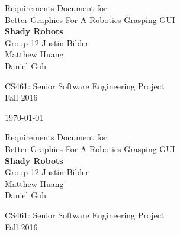 \documentclass[10pt,journal,compsoc,draftclsnofoot]{IEEEtran}
\begin{document}
\onecolumn

\begin{titlepage}
\null
\vspace{35mm}

\begin{flushleft}
\begin{bfseries}
	\vskip2mm
	\Huge{Requirements Document for\\ Better Graphics For A Robotics Grasping GUI}\\
	\vspace{30mm}
	\textbf{\huge Shady Robots} \\
	\vskip2mm
	\large{Group 12}
	\vskip5mm
	\Large{Justin Bibler \\
	Matthew Huang \\
	Daniel Goh \\}
\end{bfseries}

\vspace{15mm}
\Large{CS461: Senior Software Engineering Project} \\
\Large{Fall 2016} \\

\vspace{10mm}

\today

\end{flushleft}

\newpage
\null
\vspace{10mm}

\begin{flushleft}
\begin{bfseries}
	\vskip2mm
	\Huge{Requirements Document for\\ Better Graphics For A Robotics Grasping GUI}\\
	\vspace{15mm}
	\textbf{\huge Shady Robots} \\
	\vskip2mm
	\large{Group 12}
	\vskip5mm
	\Large{Justin Bibler \\
	Matthew Huang \\
	Daniel Goh \\}
\end{bfseries}

\vspace{15mm}
\Large{CS461: Senior Software Engineering Project} \\
\Large{Fall 2016} \\

\vspace{10mm}


\end{flushleft}
\end{titlepage}
\end{document}
